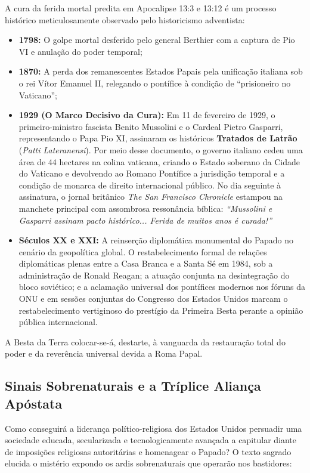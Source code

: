 \documentclass[11pt,a4paper,openany]{book}
\begin{document}
A cura da ferida mortal predita em Apocalipse 13:3 e 13:12 é um processo histórico meticulosamente observado pelo historicismo adventista:
\begin{itemize}
  \item \textbf{1798:} O golpe mortal desferido pelo general Berthier com a captura de Pio VI e anulação do poder temporal;
  \item \textbf{1870:} A perda dos remanescentes Estados Papais pela unificação italiana sob o rei Vítor Emanuel II, relegando o pontífice à condição de ``prisioneiro no Vaticano'';
  \item \textbf{1929 (O Marco Decisivo da Cura):} Em 11 de fevereiro de 1929, o primeiro-ministro fascista Benito Mussolini e o Cardeal Pietro Gasparri, representando o Papa Pio XI, assinaram os históricos \textbf{Tratados de Latrão} (\textit{Patti Lateranensi}). Por meio desse documento, o governo italiano cedeu uma área de 44 hectares na colina vaticana, criando o Estado soberano da Cidade do Vaticano e devolvendo ao Romano Pontífice a jurisdição temporal e a condição de monarca de direito internacional público. No dia seguinte à assinatura, o jornal britânico \textit{The San Francisco Chronicle} estampou na manchete principal com assombrosa ressonância bíblica: \textit{``Mussolini e Gasparri assinam pacto histórico... Ferida de muitos anos é curada!''}
  \item \textbf{Séculos XX e XXI:} A reinserção diplomática monumental do Papado no cenário da geopolítica global. O restabelecimento formal de relações diplomáticas plenas entre a Casa Branca e a Santa Sé em 1984, sob a administração de Ronald Reagan; a atuação conjunta na desintegração do bloco soviético; e a aclamação universal dos pontífices modernos nos fóruns da ONU e em sessões conjuntas do Congresso dos Estados Unidos marcam o restabelecimento vertiginoso do prestígio da Primeira Besta perante a opinião pública internacional.
\end{itemize}


A Besta da Terra colocar-se-á, destarte, à vanguarda da restauração total do poder e da reverência universal devida a Roma Papal.



\subsection{Sinais Sobrenaturais e a Tríplice Aliança Apóstata}


Como conseguirá a liderança político-religiosa dos Estados Unidos persuadir uma sociedade educada, secularizada e tecnologicamente avançada a capitular diante de imposições religiosas autoritárias e homenagear o Papado? O texto sagrado elucida o mistério expondo os ardis sobrenaturais que operarão nos bastidores:
\end{document}
